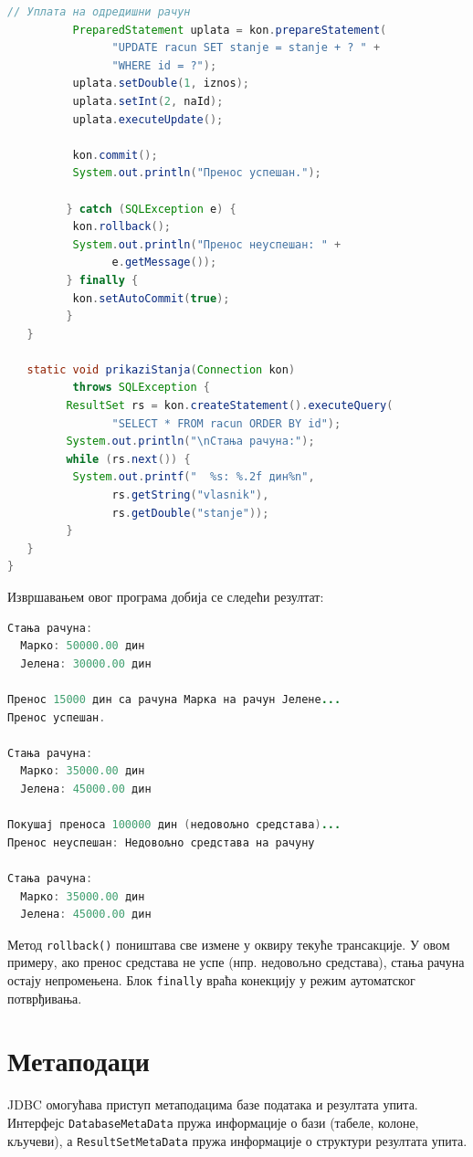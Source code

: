 \begin{lstlisting}[language=Java]
          // Уплата на одредишни рачун
          PreparedStatement uplata = kon.prepareStatement(
                "UPDATE racun SET stanje = stanje + ? " +
                "WHERE id = ?");
          uplata.setDouble(1, iznos);
          uplata.setInt(2, naId);
          uplata.executeUpdate();
 
          kon.commit();
          System.out.println("Пренос успешан.");
 
         } catch (SQLException e) {
          kon.rollback();
          System.out.println("Пренос неуспешан: " +
                e.getMessage());
         } finally {
          kon.setAutoCommit(true);
         }
   }
 
   static void prikaziStanja(Connection kon)
          throws SQLException {
         ResultSet rs = kon.createStatement().executeQuery(
                "SELECT * FROM racun ORDER BY id");
         System.out.println("\nСтања рачуна:");
         while (rs.next()) {
          System.out.printf("  %s: %.2f дин%n",
                rs.getString("vlasnik"),
                rs.getDouble("stanje"));
         }
   }
}
\end{lstlisting}


Извршавањем овог програма добија се следећи резултат:


\begin{lstlisting}[language=Java]
Стања рачуна:
  Марко: 50000.00 дин
  Јелена: 30000.00 дин
 
Пренос 15000 дин са рачуна Марка на рачун Јелене...
Пренос успешан.
 
Стања рачуна:
  Марко: 35000.00 дин
  Јелена: 45000.00 дин
 
Покушај преноса 100000 дин (недовољно средстава)...
Пренос неуспешан: Недовољно средстава на рачуну
 
Стања рачуна:
  Марко: 35000.00 дин
  Јелена: 45000.00 дин
\end{lstlisting}


Метод \texttt{rollback()} поништава све измене у оквиру текуће трансакције. У овом примеру, ако пренос средстава не успе (нпр. недовољно средстава), стања рачуна остају непромењена. Блок \texttt{finally} враћа конекцију у режим аутоматског потврђивања.


\section{Метаподаци}

JDBC омогућава приступ метаподацима базе података и резултата упита. Интерфејс \texttt{DatabaseMetaData} пружа информације о бази (табеле, колоне, кључеви), а \texttt{ResultSetMetaData} пружа информације о структури резултата упита.


